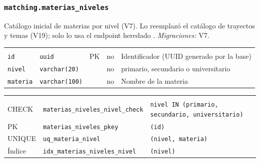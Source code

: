 \subsubsection{\texorpdfstring{\texttt{matching.materias\_\allowbreak{}niveles}}{matching.materias\_niveles}}\label{dd:matching.materias_niveles}

Catálogo inicial de materias por nivel (V7). Lo reemplazó el catálogo de trayectos y temas (V19); solo lo usa el endpoint heredado . \emph{Migraciones:} V7.

{\small
\begin{xltabular}{\textwidth}{@{}>{\raggedright\arraybackslash}p{3.6cm} >{\raggedright\arraybackslash}p{2.3cm} >{\raggedright\arraybackslash}p{1cm} >{\centering\arraybackslash}p{0.85cm} L@{}}
    \toprule
     &  &  &  &  \\
    \midrule
    \endfirsthead
    \toprule
     &  &  &  &  \\
    \midrule
    \endhead
    \bottomrule
    \endfoot
    \texttt{id} & \texttt{uuid} & PK & no & Identificador (UUID generado por la base) \\
    \texttt{nivel} & \texttt{varchar(\allowbreak{}20)} &  & no & primario, secundario o universitario \\
    \texttt{materia} & \texttt{varchar(\allowbreak{}100)} &  & no & Nombre de la materia \\
\end{xltabular}
}

{\small
\begin{xltabular}{\textwidth}{@{}>{\raggedright\arraybackslash}p{1.7cm} >{\raggedright\arraybackslash}p{4.6cm} L@{}}
    \toprule
     &  &  \\
    \midrule
    \endfirsthead
    \toprule
     &  &  \\
    \midrule
    \endhead
    \bottomrule
    \endfoot
    CHECK & \texttt{materias\_\allowbreak{}niveles\_\allowbreak{}nivel\_\allowbreak{}check} & \texttt{nivel IN (\allowbreak{}\textquotesingle{}primario\textquotesingle{},\allowbreak{} \textquotesingle{}secundario\textquotesingle{},\allowbreak{} \textquotesingle{}universitario\textquotesingle{})} \\
    PK & \texttt{materias\_\allowbreak{}niveles\_\allowbreak{}pkey} & \texttt{(\allowbreak{}id)} \\
    UNIQUE & \texttt{uq\_\allowbreak{}materia\_\allowbreak{}nivel} & \texttt{(\allowbreak{}nivel,\allowbreak{} materia)} \\
    Índice & \texttt{idx\_\allowbreak{}materias\_\allowbreak{}niveles\_\allowbreak{}nivel} & \texttt{(\allowbreak{}nivel)} \\
\end{xltabular}
}

